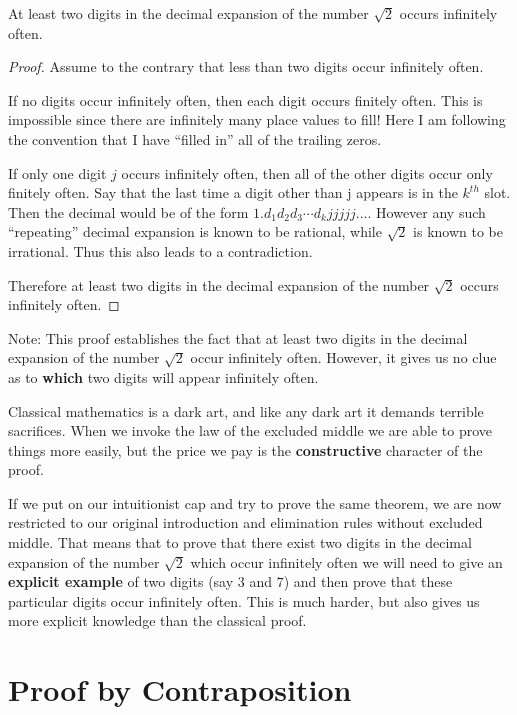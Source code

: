 \begin{example}

At least two digits in the decimal expansion of the number $\sqrt{2}$ occurs infinitely often. 

\begin{proof}
Assume to the contrary that less than two digits occur infinitely often.

If no digits occur infinitely often, then each digit occurs finitely often.  This is impossible since there are infinitely many place values to fill!  Here I am following the convention that I have ``filled in'' all of the trailing zeros.

If only one digit $j$ occurs infinitely often, then all of the other digits occur only finitely often.  Say that the last time a digit other than j appears is in the $k^{th}$ slot.  Then the decimal would be of the form $1.d_1d_2d_3\cdots d_kjjjjj...$.  However any such ``repeating'' decimal expansion is known to be rational, while $\sqrt{2}$ is known to be irrational.    Thus this also leads to a contradiction.

Therefore at least two digits in the decimal expansion of the number $\sqrt{2}$ occurs infinitely often. 
\end{proof}
	\end{example}

Note:  This proof establishes the fact that at least two digits in the decimal expansion of the number $\sqrt{2}$ occur infinitely often.  However, it gives us no clue as to \textbf{which} two digits will appear infinitely often.  

Classical mathematics is a dark art, and like any dark art it demands terrible sacrifices.  When we invoke the law of the excluded middle we are able to prove things more easily, but the price we pay is the \textbf{constructive} character of the proof.  

If we put on our intuitionist cap and try to prove the same theorem, we are now restricted to our original introduction and elimination rules without excluded middle.  That means that to prove that  there exist two digits in the decimal expansion of the number $\sqrt{2}$ which occur infinitely often we will need to give an \textbf{explicit example} of two digits (say $3$ and $7$) and then prove that these particular digits occur infinitely often.  This is much harder, but also gives us more explicit knowledge than the classical proof.

\newpage

\section{Proof by Contraposition}

